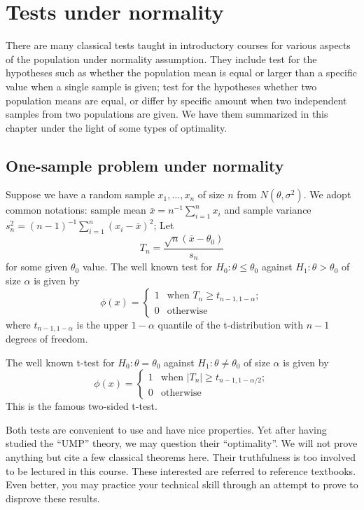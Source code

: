 \chapter{Tests under normality}

There are many classical tests taught in introductory courses for various aspects
of the population under normality assumption. They include test for the hypotheses
such as whether the population mean is equal or larger than a specific 
value when a single \iid sample is given; test for the hypotheses
whether two population means are equal, or differ by specific amount
when two independent \iid samples from two populations are given.
We have them summarized in this chapter under the light of
some types of optimality.

\section{One-sample problem under normality}

Suppose we have a random sample $x_1, \ldots, x_n$
of size $n$ from $N(\theta, \sigma^2)$.
We adopt common notations:
sample mean $\bar x = n^{-1} \sum_{i=1}^n x_i$ and
sample variance $s_n^2 = (n-1)^{-1}  \sum_{i=1}^n (x_i-\bar x)^2$;
Let 
\[
T_n = \frac{\sqrt{n}( \bar x- \theta_0)}{s_n}
\]
for some given $\theta_0$ value.
The well known test for $H_0: \theta \leq \theta_0$ against
$H_1: \theta > \theta_0$ of size $\alpha$ is given by
\[
\phi(x) =
\left \{
\begin{array}{ll}
1 &  \mbox{when  }  T_n \geq t_{n-1, 1-\alpha};
\\
0 & \mbox{otherwise}
\end{array}
\right .
\]
where $t_{n-1, 1-\alpha}$ is the upper $1-\alpha$ quantile of the t-distribution
with $n-1$ degrees of freedom.

\vs
The well known t-test for $H_0: \theta = \theta_0$ against
$H_1: \theta \neq \theta_0$ of size $\alpha$ is given by
\[
\phi(x) =
\left \{
\begin{array}{ll}
1 &  \mbox{when  }  |T_n| \geq t_{n-1, 1-\alpha/2};
\\
0 & \mbox{otherwise}
\end{array}
\right .
\]
This is the famous two-sided t-test.

Both tests are convenient to use and have nice properties. Yet after
having studied the ``UMP'' theory, we may question their ``optimality''.
We will not prove anything but cite a few classical theorems here.
Their truthfulness is too involved to be lectured in this course. These interested are
referred to reference textbooks. Even better, you may practice
your technical skill through an attempt to prove to disprove these
results.

